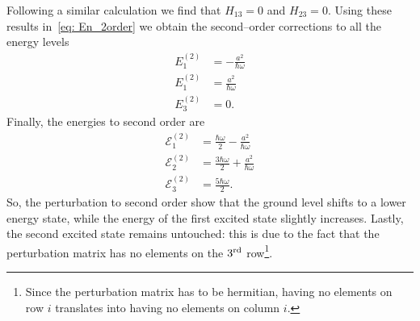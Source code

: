 Following a similar calculation we find that $H_{13} = 0$ and $H_{23} = 0$. Using these results in~\eqref{eq: En_2order} we obtain the second--order corrections to all the energy levels
\begin{align}
    E_1^{(2)} & = -\frac{a^2}{\hbar \omega} \\
    E_1^{(2)} & = \frac{a^2}{\hbar \omega} \\
    E_3^{(2)} & = 0.
\end{align}
Finally, the energies to second order are
\begin{align}
    \label{eq: En_2order_complete}
    \mathcal{E}_1^{(2)} & = \frac{\hbar \omega}{2} - \frac{a^2}{\hbar \omega} \\
    \mathcal{E}_2^{(2)} & = \frac{3 \hbar \omega}{2} + \frac{a^2}{\hbar \omega} \\
    \mathcal{E}_3^{(2)} & = \frac{5 \hbar \omega}{2}.
\end{align}
So, the perturbation to second order show that the ground level shifts to a lower energy state, while the energy of the first excited state slightly increases. Lastly, the second excited state remains untouched: this is due to the fact that the perturbation matrix has no elements on the $3^\textup{rd}$ row\footnote{Since the perturbation matrix has to be hermitian, having no elements on row $i$ translates into having no elements on column $i$.}.

